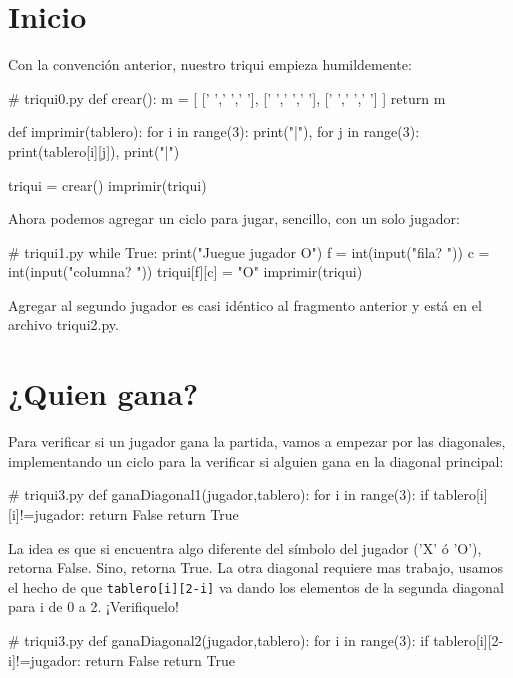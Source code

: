 \section{Inicio}

Con la convención anterior, nuestro triqui empieza humildemente:

\begin{pythoncode}
# triqui0.py
def crear():
    m =  [ [' ',' ',' '],
           [' ',' ',' '],
           [' ',' ',' '] ]
    return m


def imprimir(tablero):
    for i in range(3):
        print("|"),
        for j in range(3):
            print(tablero[i][j]),
        print("|")
        
triqui = crear()
imprimir(triqui)
\end{pythoncode}

Ahora podemos agregar un ciclo para jugar, sencillo, con un solo jugador:\pagebreak{}

\begin{pythoncode}
# triqui1.py
while True:
    print("Juegue jugador O")
    f = int(input("fila? "))
    c = int(input("columna? "))
    triqui[f][c] = "O"
    imprimir(triqui)
\end{pythoncode}

Agregar al segundo jugador es casi idéntico al fragmento anterior
y está en el archivo triqui2.py.

\section{¿Quien gana?}

Para verificar si un jugador gana la partida, vamos a empezar por
las diagonales, implementando un ciclo para la verificar si alguien
gana en la diagonal principal:

\begin{pythoncode}
# triqui3.py
def ganaDiagonal1(jugador,tablero):
    for i in range(3):
        if tablero[i][i]!=jugador:
            return False
    return True
\end{pythoncode}

La idea es que si encuentra algo diferente del símbolo del jugador
('X' ó 'O'), retorna False. Sino, retorna True. La otra diagonal requiere
mas trabajo, usamos el hecho de que \texttt{tablero{[}i{]}{[}2-i{]}}
va dando los elementos de la segunda diagonal para i de 0 a 2. ¡Verifiquelo!

\begin{pythoncode}
# triqui3.py
def ganaDiagonal2(jugador,tablero):
    for i in range(3):
        if tablero[i][2-i]!=jugador:
            return False
    return True
\end{pythoncode}

